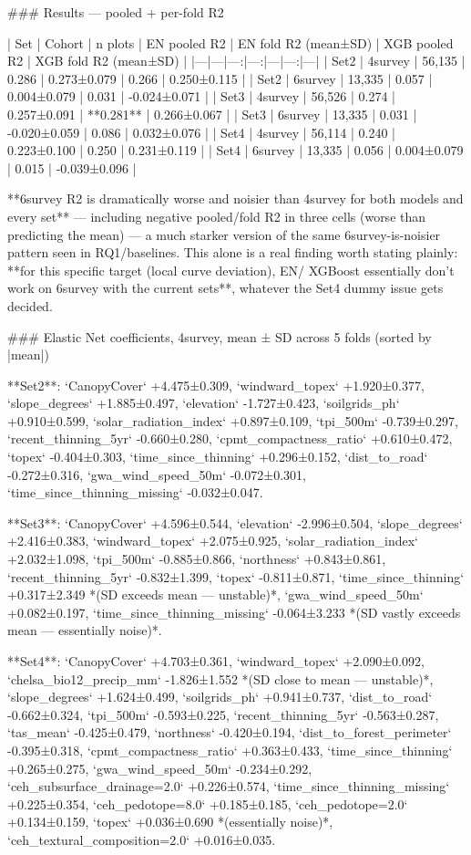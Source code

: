 ### Results — pooled + per-fold R2

| Set | Cohort | n plots | EN pooled R2 | EN fold R2 (mean±SD) | XGB pooled R2 | XGB fold R2 (mean±SD) |
|---|---|---:|---:|---|---:|---|
| Set2 | 4survey | 56,135 | 0.286 | 0.273±0.079 | 0.266 | 0.250±0.115 |
| Set2 | 6survey | 13,335 | 0.057 | 0.004±0.079 | 0.031 | -0.024±0.071 |
| Set3 | 4survey | 56,526 | 0.274 | 0.257±0.091 | **0.281** | 0.266±0.067 |
| Set3 | 6survey | 13,335 | 0.031 | -0.020±0.059 | 0.086 | 0.032±0.076 |
| Set4 | 4survey | 56,114 | 0.240 | 0.223±0.100 | 0.250 | 0.231±0.119 |
| Set4 | 6survey | 13,335 | 0.056 | 0.004±0.079 | 0.015 | -0.039±0.096 |

**6survey R2 is dramatically worse and noisier than 4survey for both models and every set** —
including negative pooled/fold R2 in three cells (worse than predicting the mean) — a much
starker version of the same 6survey-is-noisier pattern seen in RQ1/baselines. This alone is a
real finding worth stating plainly: **for this specific target (local curve deviation), EN/
XGBoost essentially don't work on 6survey with the current sets**, whatever the Set4 dummy issue
gets decided.

### Elastic Net coefficients, 4survey, mean ± SD across 5 folds (sorted by |mean|)

**Set2**: `CanopyCover` +4.475±0.309, `windward_topex` +1.920±0.377, `slope_degrees`
+1.885±0.497, `elevation` -1.727±0.423, `soilgrids_ph` +0.910±0.599, `solar_radiation_index`
+0.897±0.109, `tpi_500m` -0.739±0.297, `recent_thinning_5yr` -0.660±0.280,
`cpmt_compactness_ratio` +0.610±0.472, `topex` -0.404±0.303, `time_since_thinning`
+0.296±0.152, `dist_to_road` -0.272±0.316, `gwa_wind_speed_50m` -0.072±0.301,
`time_since_thinning_missing` -0.032±0.047.

**Set3**: `CanopyCover` +4.596±0.544, `elevation` -2.996±0.504, `slope_degrees` +2.416±0.383,
`windward_topex` +2.075±0.925, `solar_radiation_index` +2.032±1.098, `tpi_500m` -0.885±0.866,
`northness` +0.843±0.861, `recent_thinning_5yr` -0.832±1.399, `topex` -0.811±0.871,
`time_since_thinning` +0.317±2.349 *(SD exceeds mean — unstable)*, `gwa_wind_speed_50m`
+0.082±0.197, `time_since_thinning_missing` -0.064±3.233 *(SD vastly exceeds mean — essentially
noise)*.

**Set4**: `CanopyCover` +4.703±0.361, `windward_topex` +2.090±0.092, `chelsa_bio12_precip_mm`
-1.826±1.552 *(SD close to mean — unstable)*, `slope_degrees` +1.624±0.499, `soilgrids_ph`
+0.941±0.737, `dist_to_road` -0.662±0.324, `tpi_500m` -0.593±0.225, `recent_thinning_5yr`
-0.563±0.287, `tas_mean` -0.425±0.479, `northness` -0.420±0.194, `dist_to_forest_perimeter`
-0.395±0.318, `cpmt_compactness_ratio` +0.363±0.433, `time_since_thinning` +0.265±0.275,
`gwa_wind_speed_50m` -0.234±0.292, `ceh_subsurface_drainage=2.0` +0.226±0.574,
`time_since_thinning_missing` +0.225±0.354, `ceh_pedotope=8.0` +0.185±0.185, `ceh_pedotope=2.0`
+0.134±0.159, `topex` +0.036±0.690 *(essentially noise)*, `ceh_textural_composition=2.0`
+0.016±0.035.

